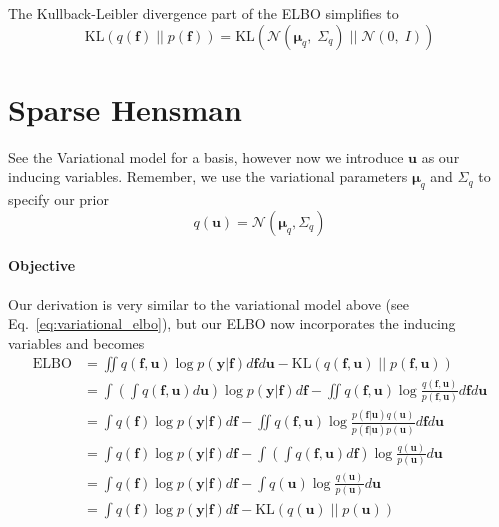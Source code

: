 \documentclass[5p,11pt]{article}
\begin{document}
The Kullback-Leibler divergence part of the ELBO simplifies to
$$ \mathrm{KL}(q(\bm{f})\;||\;p(\bm{f})) = \mathrm{KL}(\mathcal{N}(\bm{\mu}_q,\; \Sigma_q)\;||\;\mathcal{N}(0,\; I)) $$

\newpage
\section{Sparse Hensman}
See the Variational model for a basis, however now we introduce $\bm{u}$ as our inducing variables. Remember, we use the variational parameters $\bm{\mu}_q$ and $\Sigma_q$ to specify our prior
$$ q(\bm{u}) = \mathcal{N}(\bm{\mu}_q, \Sigma_q) $$

\paragraph{Objective} Our derivation is very similar to the variational model above (see Eq.~\ref{eq:variational_elbo}), but our ELBO now incorporates the inducing variables and becomes
\begin{equation}
\begin{aligned}
\mathrm{ELBO} &= \iint q(\bm{f},\bm{u}) \log p(\bm{y}|\bm{f}) d\bm{f} d\bm{u} - \mathrm{KL}(q(\bm{f},\bm{u})\;||\;p(\bm{f},\bm{u}))\\
&= \int \left(\int q(\bm{f},\bm{u}) d\bm{u} \right) \log p(\bm{y}|\bm{f}) d\bm{f} - \iint q(\bm{f},\bm{u}) \log \frac{q(\bm{f},\bm{u})}{p(\bm{f},\bm{u})} d\bm{f} d\bm{u}\\
&= \int q(\bm{f}) \log p(\bm{y}|\bm{f}) d\bm{f} - \iint q(\bm{f},\bm{u}) \log \frac{p(\bm{f}|\bm{u})q(\bm{u})}{p(\bm{f}|\bm{u})p(\bm{u})} d\bm{f} d\bm{u}\\
&= \int q(\bm{f}) \log p(\bm{y}|\bm{f}) d\bm{f} - \int \left(\int q(\bm{f},\bm{u}) d\bm{f}\right) \log \frac{q(\bm{u})}{p(\bm{u})} d\bm{u}\\
&= \int q(\bm{f}) \log p(\bm{y}|\bm{f}) d\bm{f} - \int q(\bm{u}) \log \frac{q(\bm{u})}{p(\bm{u})} d\bm{u}\\
&= \int q(\bm{f}) \log p(\bm{y}|\bm{f}) d\bm{f} - \mathrm{KL}(q(\bm{u})\;||\;p(\bm{u}))\\
\end{aligned}
\end{equation}
\end{document}
